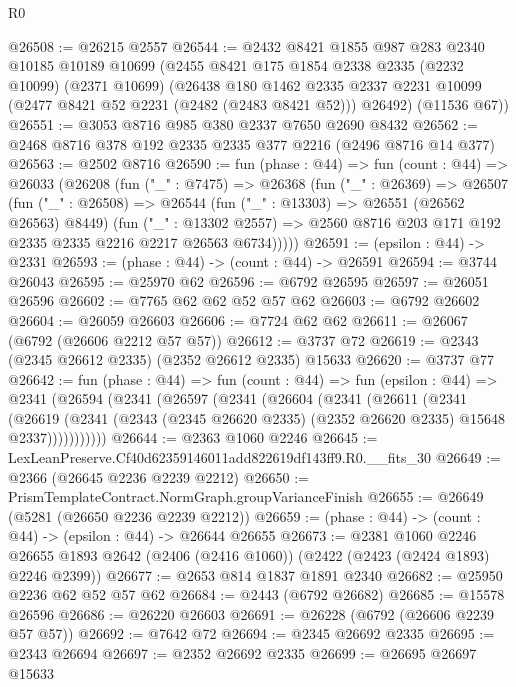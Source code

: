 \begin{lexlean}{R0}
\begin{coremodule}
@26508 := @26215 @2557
@26544 := @2432
    @8421
    @1855
    @987
    @283
    @2340
    @10185
    @10189
    @10699
    (@2455
      @8421
      @175
      @1854
      @2338
      @2335
      (@2232 @10099)
      (@2371 @10699)
      (@26438
        @180
        @1462
        @2335
        @2337
        @2231
        @10099
        (@2477 @8421 @52 @2231 (@2482 (@2483 @8421 @52)))
        @26492)
      (@11536 @67))
@26551 := @3053 @8716 @985 @380 @2337 @7650 @2690 @8432
@26562 := @2468 @8716 @378 @192 @2335 @2335 @377 @2216 (@2496 @8716 @14 @377)
@26563 := @2502 @8716
@26590 := fun (phase : @44) =>
  fun (count : @44) =>
  @26033
    (@26208
      (fun ("_" : @7475) =>
      @26368
        (fun ("_" : @26369) =>
        @26507
          (fun ("_" : @26508) =>
          @26544
            (fun ("_" : @13303) => @26551 (@26562 @26563) @8449)
            (fun ("_" : @13302 @2557) =>
            @2560 @8716 @203 @171 @192 @2335 @2335 @2216 @2217 @26563 @6734)))))
@26591 := (epsilon : @44) -> @2331
@26593 := (phase : @44) -> (count : @44) -> @26591
@26594 := @3744 @26043
@26595 := @25970 @62
@26596 := @6792 @26595
@26597 := @26051 @26596
@26602 := @7765 @62 @62 @52 @57 @62
@26603 := @6792 @26602
@26604 := @26059 @26603
@26606 := @7724 @62 @62
@26611 := @26067 (@6792 (@26606 @2212 @57 @57))
@26612 := @3737 @72
@26619 := @2343 (@2345 @26612 @2335) (@2352 @26612 @2335) @15633
@26620 := @3737 @77
@26642 := fun (phase : @44) =>
  fun (count : @44) =>
  fun (epsilon : @44) =>
  @2341
    (@26594
      (@2341
        (@26597
          (@2341
            (@26604
              (@2341
                (@26611
                  (@2341
                    (@26619
                      (@2341
                        (@2343 (@2345 @26620 @2335) (@2352 @26620 @2335) @15648 @2337)))))))))))
@26644 := @2363 @1060 @2246
@26645 := LexLeanPreserve.Cf40d62359146011add822619df143ff9.R0.__fits_30
@26649 := @2366 (@26645 @2236 @2239 @2212)
@26650 := PrismTemplateContract.NormGraph.groupVarianceFinish
@26655 := @26649 (@5281 (@26650 @2236 @2239 @2212))
@26659 := (phase : @44) -> (count : @44) -> (epsilon : @44) -> @26644 @26655
@26673 := @2381
    @1060
    @2246
    @26655
    @1893
    @2642
    (@2406 (@2416 @1060))
    (@2422 (@2423 (@2424 @1893) @2246 @2399))
@26677 := @2653 @814 @1837 @1891 @2340
@26682 := @25950 @2236 @62 @52 @57 @62
@26684 := @2443 (@6792 @26682)
@26685 := @15578 @26596
@26686 := @26220 @26603
@26691 := @26228 (@6792 (@26606 @2239 @57 @57))
@26692 := @7642 @72
@26694 := @2345 @26692 @2335
@26695 := @2343 @26694
@26697 := @2352 @26692 @2335
@26699 := @26695 @26697 @15633

\end{coremodule}
\end{lexlean}
